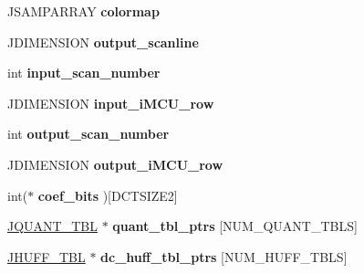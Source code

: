 \begin{DoxyCompactItemize}
J\+S\+A\+M\+P\+A\+R\+R\+AY {\bfseries colormap}
\item 
\mbox{\label{structjpeg__decompress__struct_a98ce42ac450f1e380f4682fd28c5587e}} 
J\+D\+I\+M\+E\+N\+S\+I\+ON {\bfseries output\+\_\+scanline}
\item 
\mbox{\label{structjpeg__decompress__struct_a599e90cc8d2d0f21a08329690de9b5f7}} 
int {\bfseries input\+\_\+scan\+\_\+number}
\item 
\mbox{\label{structjpeg__decompress__struct_afd263bfe59d3a1f21fa82e80ab7713ee}} 
J\+D\+I\+M\+E\+N\+S\+I\+ON {\bfseries input\+\_\+i\+M\+C\+U\+\_\+row}
\item 
\mbox{\label{structjpeg__decompress__struct_a0e070266d4d354c414b910274436b3ce}} 
int {\bfseries output\+\_\+scan\+\_\+number}
\item 
\mbox{\label{structjpeg__decompress__struct_ae6adbb167857080cd9fc3b59b8f0ae26}} 
J\+D\+I\+M\+E\+N\+S\+I\+ON {\bfseries output\+\_\+i\+M\+C\+U\+\_\+row}
\item 
\mbox{\label{structjpeg__decompress__struct_afdc08cc41b462e5c864a07ca9ad46a04}} 
int($\ast$ {\bfseries coef\+\_\+bits} )\mbox{[}D\+C\+T\+S\+I\+Z\+E2\mbox{]}
\item 
\mbox{\label{structjpeg__decompress__struct_a99349f969e6ef0199d73b77005f1c7ac}} 
\hyperlink{struct_j_q_u_a_n_t___t_b_l}{J\+Q\+U\+A\+N\+T\+\_\+\+T\+BL} $\ast$ {\bfseries quant\+\_\+tbl\+\_\+ptrs} \mbox{[}N\+U\+M\+\_\+\+Q\+U\+A\+N\+T\+\_\+\+T\+B\+LS\mbox{]}
\item 
\mbox{\label{structjpeg__decompress__struct_ad70d88daaa252af39cddd28d91d5e72b}} 
\hyperlink{struct_j_h_u_f_f___t_b_l}{J\+H\+U\+F\+F\+\_\+\+T\+BL} $\ast$ {\bfseries dc\+\_\+huff\+\_\+tbl\+\_\+ptrs} \mbox{[}N\+U\+M\+\_\+\+H\+U\+F\+F\+\_\+\+T\+B\+LS\mbox{]}
\item 
\mbox{\label{structjpeg__decompress__struct_aee32db8740389ecb5e83255bd7f27ca9}} 

\end{DoxyCompactItemize}
